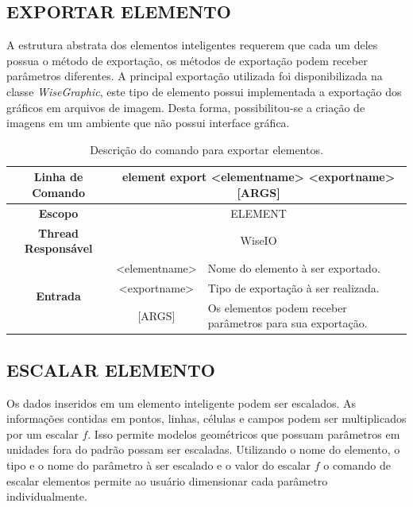 \documentclass[a4paper,12pt]{monografia}
\theoremstyle{plain}
\theoremstyle{definition}
\theoremstyle{remark}
\begin{document}
\subsection{EXPORTAR ELEMENTO}\label{sec:export_element}

A estrutura abstrata dos elementos inteligentes requerem que cada um deles possua o método de exportação, os métodos de exportação podem receber parâmetros diferentes. A principal exportação utilizada foi disponibilizada na classe \textit{WiseGraphic}, este tipo de elemento possui implementada a exportação dos gráficos em arquivos de imagem. Desta forma, possibilitou-se a criação de imagens em um ambiente que não possui interface gráfica.

\begin{center}
\begin{table}[!htbp]
	\begin{tabular}{|c|c|m{}|}
		\hline
		\textbf{Linha de Comando} & \multicolumn{2}{c|}{element export <element\underline{\space\space}name> <export\underline{\space\space}name> [ARGS]} \\
		\hline
		\textbf{Escopo} & \multicolumn{2}{c|}{ELEMENT} \\
		\hline
		\textbf{Thread Responsável} & \multicolumn{2}{c|}{WiseIO} \\
		\hline
		\multirow{3}{*}{\textbf{Entrada}} & <element\underline{\space\space}name> & Nome do elemento à ser exportado. \\
		& <export\underline{\space\space}name> & Tipo de exportação à ser realizada. \\
		& [ARGS] & Os elementos podem receber parâmetros para sua exportação. \\
		\hline
	\end{tabular}
	\caption{Descrição do comando para exportar elementos.}
	\label{tab:export}
\end{table}
\end{center}

\subsection{ESCALAR ELEMENTO}\label{sec:scale_element}

Os dados inseridos em um elemento inteligente podem ser escalados. As informações contidas em pontos, linhas, células e campos podem ser multiplicados por um escalar $f$. Isso permite modelos geométricos que possuam parâmetros em unidades fora do padrão possam ser escaladas. Utilizando o nome do elemento, o tipo e o nome do parâmetro à ser escalado e o valor do escalar $f$ o comando de escalar elementos permite ao usuário dimensionar cada parâmetro individualmente.
\end{document}
